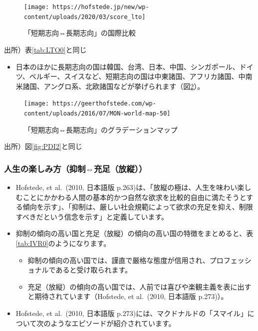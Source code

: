 \documentclass[
]{book}
\providecommand{\tightlist}{%
  \setlength{\itemsep}{0pt}\setlength{\parskip}{0pt}}
\begin{document}
\begin{figure}
\texttt{[image: https://hofstede.jp/new/wp-content/uploads/2020/03/score\_lto]} \caption{「短期志向⇔長期志向」の国際比較}\label{fig:LTO1}
\end{figure}

出所）表\ref{tab:LTO0}と同じ

\begin{itemize}
\tightlist
\item
  日本のほかに長期志向の国は韓国、台湾、日本、中国、シンガポール、ドイツ、ベルギー、スイスなど、短期志向の国は中東諸国、アフリカ諸国、中南米諸国、アングロ系、北欧諸国などが挙げられます（図\ref{fig:LTO2}）。
\end{itemize}

\begin{figure}
\texttt{[image: https://geerthofstede.com/wp-content/uploads/2016/07/MON-world-map-50]} \caption{「短期志向⇔長期志向」のグラデーションマップ}\label{fig:LTO2}
\end{figure}

出所）図\ref{fig:PDI2}と同じ

\hypertarget{ux4ebaux751fux306eux697dux3057ux307fux65b9ux6291ux5236ux5145ux8db3ux653eux7e26}{%
\subsubsection{人生の楽しみ方（抑制⇔充足（放縦））}\label{ux4ebaux751fux306eux697dux3057ux307fux65b9ux6291ux5236ux5145ux8db3ux653eux7e26}}

\begin{itemize}
\item
  Hofstede, et al.~(2010, 日本語版 p.263)は、「放縦の極は、人生を味わい楽しむことにかかわる人間の基本的かつ自然な欲求を比較的自由に満たそうとする傾向を示す」、「抑制は、厳しい社会規範によって欲求の充足を抑え、制限すべきだという信念を示す」と定義しています。
\item
  抑制の傾向の高い国と充足（放縦）の傾向の高い国の特徴をまとめると、表\ref{tab:IVR0}のようになります。

  \begin{itemize}
  \item
    抑制の傾向の高い国では、謹直で厳格な態度が信用され、プロフェッショナルであると受け取られます。
  \item
    充足（放縦）の傾向の高い国では、人前では喜びや楽観主義を表に出すと期待されています（Hofstede, et al.~(2010, 日本語版 p.273)）。
  \end{itemize}
\item
  Hofstede, et al.~(2010, 日本語版 p.273)には、マクドナルドの「スマイル」について次のようなエピソードが紹介されています。
\end{itemize}
\end{document}
